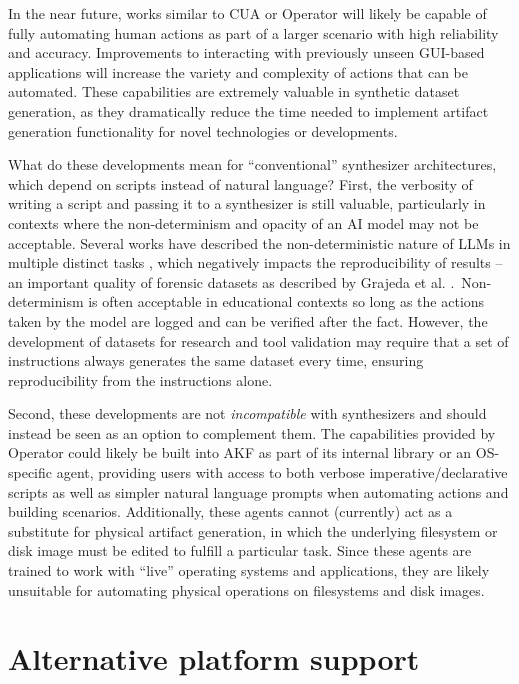\documentclass[letterpaper,12pt]{report}
\begin{document}
In the near future, works similar to CUA or Operator will likely be
capable of fully automating human actions as part of a larger scenario
with high reliability and accuracy. Improvements to interacting with
previously unseen GUI-based applications will increase the variety and
complexity of actions that can be automated. These capabilities are
extremely valuable in synthetic dataset generation, as they dramatically
reduce the time needed to implement artifact generation functionality
for novel technologies or developments.

What do these developments mean for ``conventional'' synthesizer
architectures, which depend on scripts instead of natural language?
First, the verbosity of writing a script and passing it to a synthesizer
is still valuable, particularly in contexts where the non-determinism
and opacity of an AI model may not be acceptable. Several works have
described the non-deterministic nature of LLMs in multiple distinct
tasks
\cite{astekinExploratoryStudyHow2024,songGoodBadGreedy2024,ouyangEmpiricalStudyNonDeterminism2025},
which negatively impacts the reproducibility of results -- an important
quality of forensic datasets as described by Grajeda et al.
\cite{grajedaAvailabilityDatasetsDigital2017}.~Non-determinism is
often acceptable in educational contexts so long as the actions taken by
the model are logged and can be verified after the fact. However, the
development of datasets for research and tool validation may require
that a set of instructions always generates the same dataset every time,
ensuring reproducibility from the instructions alone.

Second, these developments are not \emph{incompatible} with synthesizers
and should instead be seen as an option to complement them. The
capabilities provided by Operator could likely be built into AKF as part
of its internal library or an OS-specific agent, providing users with
access to both verbose imperative/declarative scripts as well as simpler
natural language prompts when automating actions and building scenarios.
Additionally, these agents cannot (currently) act as a substitute for
physical artifact generation, in which the underlying filesystem or disk
image must be edited to fulfill a particular task. Since these agents
are trained to work with ``live'' operating systems and applications,
they are likely unsuitable for automating physical operations on
filesystems and disk images.

\section{Alternative platform
support}\label{alternative-platform-support}
\end{document}

